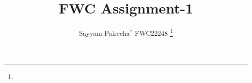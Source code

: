 \documentclass[journal,12pt,twocolumn]{IEEEtran}
\theoremstyle{remark}
\begin{document}



\vspace{3cm}

\title{
FWC Assignment-1
}
\author{ Sayyam Palrecha$^{*}$ FWC22248%
	\thanks{}
	
}


%
%
%

% 
%



% 
\end{document}
